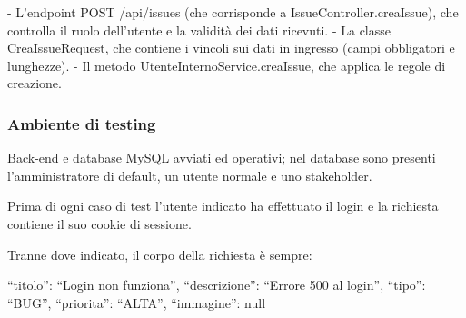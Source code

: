 - L'endpoint POST /api/issues (che corrisponde a IssueController.creaIssue), 
che controlla il ruolo dell'utente e la validità dei dati ricevuti. 
- La classe CreaIssueRequest, che contiene i vincoli sui dati in ingresso 
(campi obbligatori e lunghezze). 
- Il metodo UtenteInternoService.creaIssue, che applica le regole di creazione. 

\subsubsection{Ambiente di testing} 

Back-end e database MySQL avviati ed operativi; nel database sono 
presenti l'amministratore di default, un utente normale e uno stakeholder.  

Prima di ogni caso di test l'utente indicato ha effettuato il login
 e la richiesta contiene il suo cookie di sessione.  

Tranne dove indicato, il corpo della richiesta è sempre: 

{ “titolo”: “Login non funziona”, “descrizione”: “Errore 500 al login”, “tipo”: “BUG”, 
“priorita”: “ALTA”, “immagine”: null } 

\clearpage


